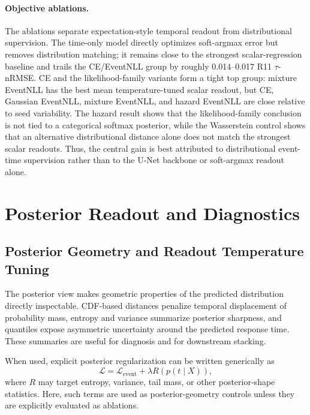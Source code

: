 \documentclass[12pt]{article}
\begin{document}
\paragraph{Objective ablations.}
The ablations separate expectation-style temporal readout from distributional supervision. The time-only model directly optimizes soft-argmax error but removes distribution matching; it remains close to the strongest scalar-regression baseline and trails the CE/EventNLL group by roughly 0.014--0.017 R11 \(\tau\)-nRMSE. CE and the likelihood-family variants form a tight top group: mixture EventNLL has the best mean temperature-tuned scalar readout, but CE, Gaussian EventNLL, mixture EventNLL, and hazard EventNLL are close relative to seed variability. The hazard result shows that the likelihood-family conclusion is not tied to a categorical softmax posterior, while the Wasserstein control shows that an alternative distributional distance alone does not match the strongest scalar readouts. Thus, the central gain is best attributed to distributional event-time supervision rather than to the U-Net backbone or soft-argmax readout alone.

\section{Posterior Readout and Diagnostics}
\label{sec:posterior_diagnostics}

\subsection{Posterior Geometry and Readout Temperature Tuning}

The posterior view makes geometric properties of the predicted distribution directly inspectable. CDF-based distances penalize temporal displacement of probability mass, entropy and variance summarize posterior sharpness, and quantiles expose asymmetric uncertainty around the predicted response time. These summaries are useful for diagnosis and for downstream stacking.

When used, explicit posterior regularization can be written generically as
\begin{equation}
\label{eq:posterior_regularized_objective}
\mathcal{L} = \mathcal{L}_{\mathrm{event}} + \lambda R\!\left(p(t\mid X)\right),
\end{equation}
where $R$ may target entropy, variance, tail mass, or other posterior-shape statistics. Here, such terms are used as posterior-geometry controls unless they are explicitly evaluated as ablations.
\end{document}
